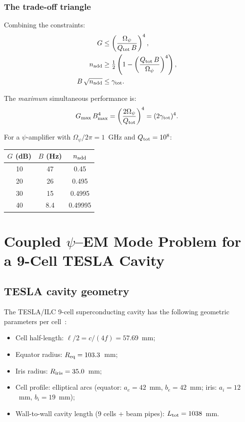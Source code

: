 \documentclass[12pt,aps,prd,twocolumn,superscriptaddress,nofootinbib]{revtex4-2}
\newcommand{\Opsi}{\Omega_\psi}
\newcommand{\half}{\tfrac{1}{2}}
\begin{document}
\subsubsection{The trade-off triangle}

Combining the constraints:
\begin{align}
G &\leq \left(\frac{\Opsi}{Q_{\rm tot}\,B}\right)^4,
\label{eq:triangle_G}\\
n_{\rm add} &\geq \half\left(1 - \left(\frac{Q_{\rm tot}\,B}{\Opsi}
\right)^4\right),
\label{eq:triangle_n}\\
B\,\sqrt{n_{\rm add}} &\leq \gamma_{\rm tot}.
\label{eq:triangle_Bn}
\end{align}

The \emph{maximum} simultaneous performance is:
\begin{equation}
G_{\rm max}\,B_{\rm max}^4 = \left(\frac{2\Opsi}{Q_{\rm tot}}\right)^4
= (2\gamma_{\rm tot})^4.
\label{eq:triangle_max}
\end{equation}

For a $\psi$-amplifier with $\Opsi/2\pi = 1$~GHz and
$Q_{\rm tot} = 10^8$:
\begin{center}
\begin{tabular}{ccc}
\toprule
$G$ (dB) & $B$ (Hz) & $n_{\rm add}$ \\
\midrule
10 & 47 & 0.45 \\
20 & 26 & 0.495 \\
30 & 15 & 0.4995 \\
40 & 8.4 & 0.49995 \\
\bottomrule
\end{tabular}
\end{center}



\section{Coupled $\psi$--EM Mode Problem for a 9-Cell TESLA Cavity}
\label{sec:tesla}

\subsection{TESLA cavity geometry}
\label{sec:tesla_geom}

The TESLA/ILC 9-cell superconducting cavity has the following
geometric parameters per cell~\cite{Aune2000}:
\begin{itemize}[noitemsep]
\item Cell half-length: $\ell/2 = c/(4f) = 57.69$~mm;
\item Equator radius: $R_{\rm eq} = 103.3$~mm;
\item Iris radius: $R_{\rm iris} = 35.0$~mm;
\item Cell profile: elliptical arcs (equator: $a_e = 42$~mm,
$b_e = 42$~mm; iris: $a_i = 12$~mm, $b_i = 19$~mm);
\item Wall-to-wall cavity length (9 cells + beam pipes):
$L_{\rm tot} = 1038$~mm.
\end{itemize}
\end{document}
